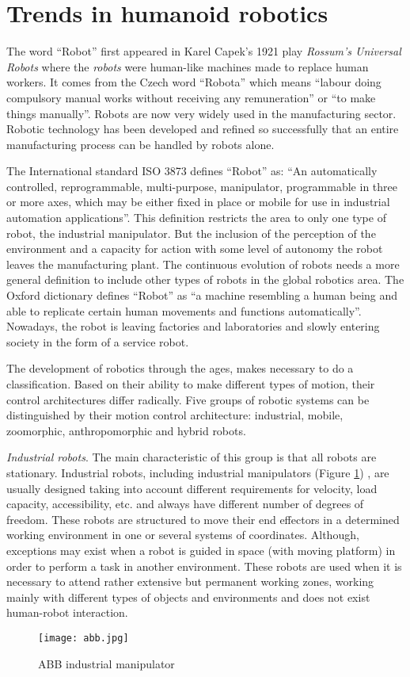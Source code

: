 \section{Trends in humanoid robotics}

The word ``Robot'' first appeared in Karel Capek's 1921 play \textit{Rossum's Universal Robots} where the \textit{robots} were human-like machines made to replace human workers. It comes from the Czech word ``Robota'' which means ``labour doing compulsory manual works without receiving any remuneration'' or ``to make things manually''. Robots are now very widely used in the manufacturing sector. Robotic technology has been developed and refined so successfully that an entire manufacturing process can be handled by robots alone.

The International standard ISO 3873 defines ``Robot'' as: ``An automatically controlled, reprogrammable, multi-purpose, manipulator, programmable in three or more axes, which may be either fixed in place or mobile for use in industrial automation applications''. This definition restricts the area to only one type of robot, the industrial manipulator. But the inclusion of the perception of the environment and a capacity for action with some level of autonomy the robot leaves the manufacturing plant. The continuous evolution of robots needs a more general definition to include other types of robots in the global robotics area. The Oxford dictionary defines ``Robot'' as ``a machine resembling a human being and able to replicate certain human movements and functions automatically''. Nowadays, the robot is leaving factories and laboratories and slowly entering society in the form of a service robot.

The development of robotics through the ages, makes necessary to do a classification. Based on their ability to make different types of motion, their control architectures differ radically. Five groups of robotic systems can be distinguished by their motion control architecture: industrial, mobile, zoomorphic, anthropomorphic and hybrid robots.

\textit{Industrial robots}. The main characteristic of this group is that all robots are stationary. Industrial robots, including industrial manipulators (Figure \ref{fig:abb}) , are usually designed taking into account different requirements for velocity, load capacity, accessibility, etc. and always have different number of degrees of freedom. These robots are structured to move their end effectors in a determined working environment in one or several systems of coordinates. Although, exceptions may exist when a robot is guided in space (with moving platform) in order to perform a task in another environment. These robots are used when it is necessary to attend rather extensive but permanent working zones, working mainly with different types of objects and environments and does not exist human-robot interaction.
\begin{figure}[!hbt]
\centering
\texttt{[image: abb.jpg]}
\caption{ABB industrial manipulator}
\label{fig:abb}
\end{figure}
 
